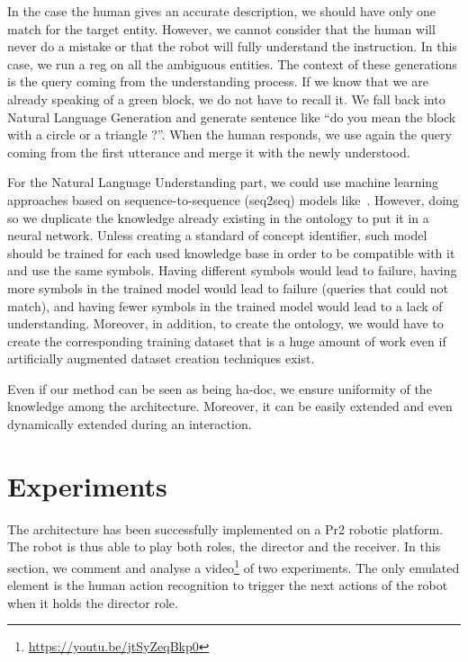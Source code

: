 In the case the human gives an accurate description, we should have only one match for the target entity. However, we cannot consider that the human will never do a mistake or that the robot will fully understand the instruction. In this case, we run a \acrshort{reg} on all the ambiguous entities. The context of these generations is the \sparql{} query coming from the understanding process. If we know that we are already speaking of a green block, we do not have to recall it. We fall back into Natural Language Generation and generate sentence like ``do you mean the block with a circle or a triangle ?''. When the human responds, we use again the \sparql{} query coming from the first utterance and merge it with the newly understood.

For the Natural Language Understanding part, we could use machine learning approaches based on sequence-to-sequence (seq2seq) models like~\cite{panchbhai_2020_exploring}. However, doing so we duplicate the knowledge already existing in the ontology to put it in a neural network. Unless creating a standard of concept identifier, such model should be trained for each used knowledge base in order to be compatible with it and use the same symbols. Having different symbols would lead to failure, having more symbols in the trained model would lead to failure (queries that could not match), and having fewer symbols in the trained model would lead to a lack of understanding. Moreover, in addition, to create the ontology, we would have to create the corresponding training dataset that is a huge amount of work even if artificially augmented dataset creation techniques exist.

Even if our method can be seen as being ha-doc, we ensure uniformity of the knowledge among the architecture. Moreover, it can be easily extended and even dynamically extended during an interaction.

\section{Experiments}

The architecture has been successfully implemented on a Pr2 robotic platform. The robot is thus able to play both roles, the director and the receiver. In this section, we comment and analyse a video\footnote{\url{https://youtu.be/jtSyZeqBkp0}} of two experiments. The only emulated element is the human action recognition to trigger the next actions of the robot when it holds the director role.

